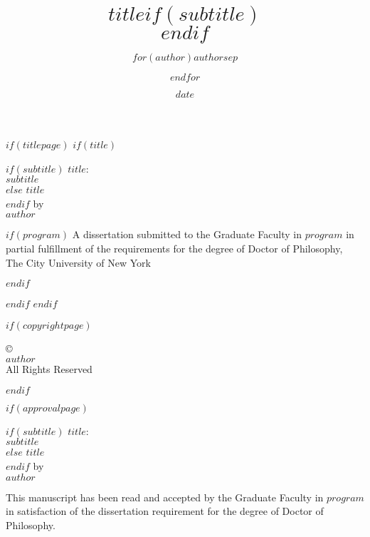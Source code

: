 \documentclass[$if(draft)$$draft$,$endif$$if(fontsize)$$fontsize$,$endif$$if(lang)$$babel-lang$,$endif$$if(papersize)$$papersize$,$endif$$if(sides)$$sides$,$endif$$for(classoption)$$classoption$$sep$,$endfor$]{$documentclass$}
\title{$title$$if(subtitle)$\\\vspace{0.5em}{\large $subtitle$}$endif$}
\author{$for(author)$$author$$sep$ \and $endfor$}
\date{$date$}
\begin{document}
\frontmatter
$if(titlepage)$
$if(title)$
\begin{titlepage}
\begin{center}
\phantom{}\vspace{2in}
$if(subtitle)$
\uppercase{$title$}:\\
\uppercase{$subtitle$}\\[0.5in]
$else$
\uppercase{$title$}\\[0.5in]
$endif$
by \\[0.5in]
\uppercase{$author$}\par
\vspace{\fill}
$if(program)$
A dissertation submitted to the Graduate Faculty in $program$ in partial fulfillment of the requirements for the degree of Doctor of Philosophy,\\The City University of New York
\\[0.25in]
\par
$endif$

\number\year

\end{center}
\end{titlepage}
\setcounter{page}{2}
$endif$
$endif$

$if(copyrightpage)$
\phantom{}\vspace{\fill}
\begin{center}
\copyright\enspace\number\year\\
\uppercase{$author$}\\
All Rights Reserved\\
\end{center}
$endif$

$if(approvalpage)$
\newpage
\begin{center}
\singlespacing
$if(subtitle)$
$title$:\\
$subtitle$\\[1em]
$else$
$title$\\[1em]
$endif$
by \\[1em]
$author$\par
\end{center}

\begin{changemargin}{0.5in}{0.5in}
\singlespacing
\raggedright
This manuscript has been read and accepted by the Graduate Faculty in $program$ in satisfaction of the dissertation requirement for the degree of Doctor of Philosophy.
\end{changemargin}
\end{document}
